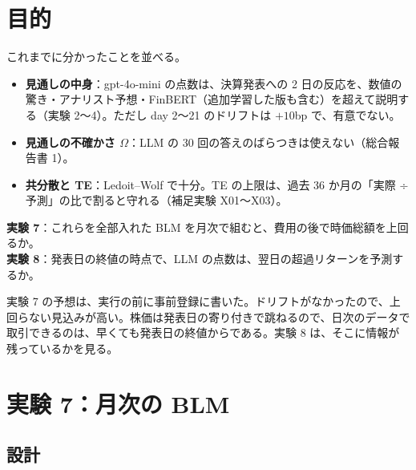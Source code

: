 \documentclass[xelatex,ja=standard,jafont=haranoaji,a4paper,10pt,openany]{bxjsreport}
\begin{document}
\setcounter{tocdepth}{1}
{\small\tableofcontents}

\chapter{目的}\label{ch:intro}

これまでに分かったことを並べる。

\begin{itemize}
\item \textbf{見通しの中身}：gpt-4o-mini の点数は、決算発表への 2 日の反応を、数値の驚き・アナリスト予想・FinBERT（追加学習した版も含む）を超えて説明する（実験 2〜4）。ただし day 2〜21 のドリフトは $+10$bp で、有意でない。
\item \textbf{見通しの不確かさ $\Omega$}：LLM の 30 回の答えのばらつきは使えない（総合報告書 1）。
\item \textbf{共分散と TE}：Ledoit--Wolf で十分。TE の上限は、過去 36 か月の「実際 ÷ 予測」の比で割ると守れる（補足実験 X01〜X03）。
\end{itemize}

\begin{verdict}[問い]
\textbf{実験 7}：これらを全部入れた BLM を月次で組むと、費用の後で時価総額を上回るか。\\
\textbf{実験 8}：発表日の終値の時点で、LLM の点数は、翌日の超過リターンを予測するか。
\end{verdict}

実験 7 の予想は、実行の前に事前登録に書いた。ドリフトがなかったので、上回らない見込みが高い。株価は発表日の寄り付きで跳ねるので、日次のデータで取引できるのは、早くても発表日の終値からである。実験 8 は、そこに情報が残っているかを見る。

\chapter{実験 7：月次の BLM}\label{ch:e7}

\section{設計}
\end{document}

